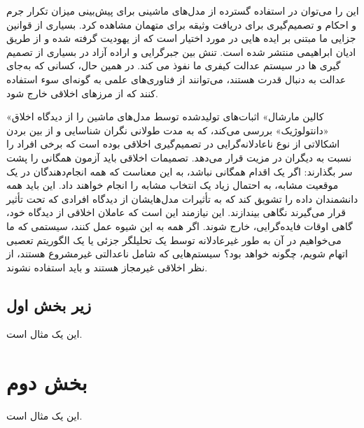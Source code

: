 \documentclass[10pt,oneside]{book}
\begin{document}
    این را می‌توان در استفاده گسترده از مدل‌های ماشینی برای پیش‌بینی میزان تکرار جرم و احکام و تصمیم‌گیری برای دریافت وثیقه برای متهمان مشاهده کرد.
    بسیاری از قوانین جزایی ما مبتنی بر ایده هایی در مورد اختیار است که از یهودیت گرفته شده و از طریق ادیان ابراهیمی منتشر شده است.
    تنش بین جبرگرایی و اراده آزاد در بسیاری از تصمیم گیری ها در سیستم عدالت کیفری ما نفوذ می کند.
    در همین حال، کسانی که به‌جای عدالت به دنبال قدرت هستند، می‌توانند از فناوری‌های علمی به گونه‌ای سوء استفاده کنند که از مرزهای اخلاقی خارج شود.

    «کالین مارشال» اثبات‌های تولیدشده توسط مدل‌های ماشین را از دیدگاه اخلاق «دانتولوژیک» بررسی می‌کند، که به مدت طولانی نگران شناسایی و از بین بردن اشکالاتی از نوع ناعادلانه‌گرایی در تصمیم‌گیری اخلاقی بوده است که برخی افراد را نسبت به دیگران در مزیت قرار می‌دهد.
    تصمیمات اخلاقی باید آزمون همگانی را پشت سر بگذارند: اگر یک اقدام همگانی نباشد، به این معناست که همه انجام‌دهندگان در یک موقعیت مشابه، به احتمال زیاد یک انتخاب مشابه را انجام خواهند داد.
    این باید همه دانشمندان داده را تشویق کند که به تأثیرات مدل‌هایشان از دیدگاه افرادی که تحت تأثیر قرار می‌گیرند نگاهی بیندازند. این نیازمند این است که عاملان اخلاقی از دیدگاه خود، گاهی اوقات فایده‌گرایی، خارج شوند. اگر همه به این شیوه عمل کنند، سیستمی که ما می‌خواهیم در آن به طور غیرعادلانه توسط یک تحلیلگر جزئی یا یک الگوریتم تعصبی اتهام شویم، چگونه خواهد بود؟ سیستم‌هایی که شامل ناعدالتی غیرمشروع هستند، از نظر اخلاقی غیرمجاز هستند و باید استفاده نشوند.




    \subsection{زیر بخش اول}

    این یک مثال است.


    \section{بخش دوم}

    این یک مثال است.

    \backmatter
\end{document}
